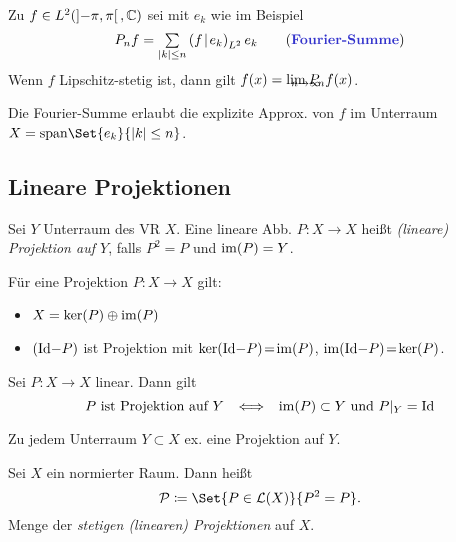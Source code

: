 \documentclass{cheat-sheet}
\newcommand{\LSO}{\mathcal{L}} %
\newcommand{\scp}[2]{\left( #1 \!\mid\! #2 \right)} %
\begin{document}
\begin{lem}
  Zu $f \in L^2(\left] -\pi, \pi \right[, \mathbb{C})$ sei mit $e_k$ wie im Beispiel
  \[ P_n f = \sum_{\abs{k} \leq n} \scp{f}{e_k}_{L^2} e_k \tag*{(\emph{Fourier-Summe})} \]
  Wenn $f$ Lipschitz-stetig ist, dann gilt $f(x) = \lim_{\mathclap{n \to \infty}} P_n f(x)$.
\end{lem}

\begin{bem}
  Die Fourier-Summe erlaubt die explizite Approx. von $f$ im Unterraum $X = \mathrm{span} \Set{e_k}{ \abs{k} \leq n }$.
\end{bem}


\subsection{Lineare Projektionen}

\begin{defn}
  Sei $Y$ Unterraum des VR $X$. Eine lineare Abb. $P : X \to X$ heißt \emph{(lineare) Projektion auf $Y$}, falls $P^2 = P$ und $\mathop{\mathrm{im}}(P) = Y$.
\end{defn}

\begin{lem}
  Für eine Projektion $P : X \to X$ gilt:
  \begin{itemize}
    \item $X = \ker(P) \oplus \mathop{\mathrm{im}}(P)$
    \item $(\mathrm{Id} {-} P)$ ist Projektion mit $\ker(\mathrm{Id} {-} P) \!=\! \mathop{\mathrm{im}}(P)$, $\mathop{\mathrm{im}}(\mathrm{Id} {-} P) \!=\! \ker(P)$.
  \end{itemize}
\end{lem}

\begin{lem}
  Sei $P : X \to X$ linear. Dann gilt
  \[
    \text{$P$ ist Projektion auf $Y$}
    \enspace \iff \enspace
    \mathop{\mathrm{im}}(P) \subset Y \text{ und } P|_Y = \mathrm{Id}
  \]
\end{lem}

\begin{bem}
  Zu jedem Unterraum $Y \subset X$ ex. eine Projektion auf $Y$.
\end{bem}

\begin{defn}
  Sei $X$ ein normierter Raum. Dann heißt
  \[ \mathcal{P} \coloneqq \Set{P \in \LSO(X)}{P^2 = P}. \]
  Menge der \emph{stetigen (linearen) Projektionen} auf $X$.
\end{defn}
\end{document}
